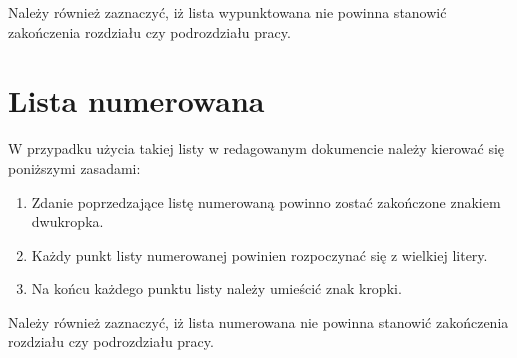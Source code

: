 Należy również zaznaczyć, iż lista wypunktowana nie powinna stanowić zakończenia rozdziału czy podrozdziału pracy.



\section{Lista numerowana}

W przypadku użycia takiej listy w redagowanym dokumencie należy kierować się poniższymi zasadami:

\begin{enumerate}
\item Zdanie poprzedzające listę numerowaną powinno zostać zakończone znakiem dwukropka.
\item Każdy punkt listy numerowanej powinien rozpoczynać się z wielkiej litery.
\item Na końcu każdego punktu listy należy umieścić znak kropki.
\end{enumerate}

Należy również zaznaczyć, iż lista numerowana nie powinna stanowić zakończenia rozdziału czy podrozdziału pracy.




